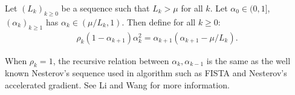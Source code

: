 \documentclass[12pt]{article}
\begin{document}
        \begin{definition}\label{def:rwapg-seq}
            Let $(L_k)_{k \ge 0}$ be a sequence such that $L_k > \mu$ for all $k$. 
            Let $\alpha_0 \in (0, 1]$, $(\alpha_k)_{k \ge 1}$ has $\alpha_k \in (\mu/ L_k, 1)$. 
            Then define for all $k \ge 0$: 
            \begin{align*}
                \rho_k(1 - \alpha_{k + 1})\alpha_k^2 = \alpha_{k + 1}(\alpha_{k + 1} - \mu/L_k). 
            \end{align*}
        \end{definition}
        \begin{remark}
            When $\rho_k = 1$, the recursive relation between $\alpha_k, \alpha_{k - 1}$ is the same as the well known Nesterov's sequence used in algorithm such as FISTA and Nesterov's accelerated gradient. 
            See Li and Wang \cite{li_relaxed_2025} for more information. 
        \end{remark}
        
\end{document}
